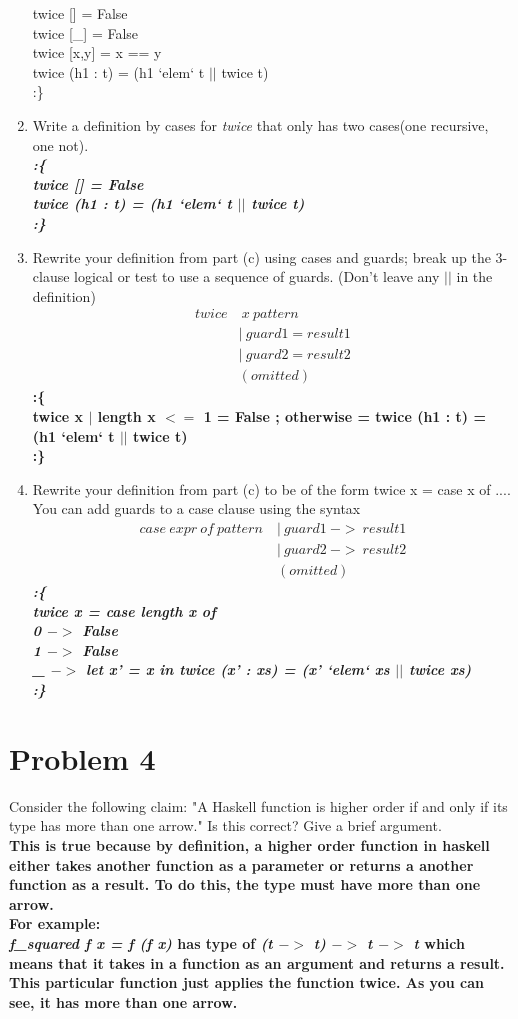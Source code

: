 \documentclass[a4paper, 12pt,fleqn]{article}
\begin{document}
\begin{enumerate}[label = (\alph*)]
{{twice [] = False\\
twice [\_] = False\\
twice [x,y] = x == y\\
twice (h1 : t) = (h1 `elem` t $||$ twice t)\\
:\}
}
}
\item Write a definition by cases for \textit{twice} that only has two cases(one recursive, one not).\\
\textbf{
\textit{:\{\\
twice [] = False\\
twice (h1 : t) = (h1 `elem` t $||$ twice t)\\
:\}
}
}
\item Rewrite your definition from part (c) using cases and guards; break up the 3-clause logical or test to use a sequence of guards. (Don't leave any $||$ in the definition)
\begin{align*}
twice&\ x\ pattern\\
&|\ guard1 = result1\\
&|\ guard2 = result2\\
&(omitted)
\end{align*}
\textbf{
:\{\\
twice x $|$ length x $<=$ 1 = False ; otherwise = twice (h1 : t) = (h1 `elem` t $||$ twice t)\\
:\}
}
\pagebreak
\item Rewrite your definition from part (c) to be of the form twice x = case x of .... You can add guards to a case clause using the syntax
\begin{align*}
case\ expr\ of\ pattern\ &|\ guard1\ ->\ result1\\
&|\ guard2 \ ->\ result2\\
&(omitted)
\end{align*}
\textbf{
\textit{
:\{\\
twice x = case length x of\\
0 $->$ False\\
1 $->$ False\\
\_ $->$ let x' = x in twice (x' : xs) = (x' `elem` xs $||$ twice xs)\\
:\}
}
}
\end{enumerate}
\section*{Problem 4}
Consider the following claim: "A Haskell function is higher order if and only if its type has more than one arrow." Is this correct? Give a brief argument.\\
\textbf{This is true because by definition, a higher order function in haskell either takes another function as a parameter or returns a another function as a result. To do this, the type must have more than one arrow.\\
For example:\\
\textit{f\_squared f x = f (f x)} has type of \textit{(t $->$ t) $->$ t $->$ t} which means that it takes in a function as an argument and returns a result. This particular function just applies the function twice. As you can see, it has more than one arrow.
}
\end{document}
